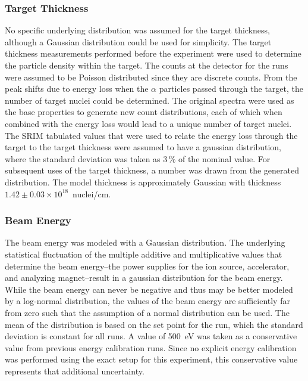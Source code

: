 \subsubsection{Target Thickness}
No specific underlying distribution was assumed for the target
thickness, although a Gaussian distribution could be used for
simplicity. The target thickness measurements performed before the
experiment were used to determine the particle density within the
target. The counts at the detector for the runs were assumed to be
Poisson distributed since they are discrete counts. From the peak shifts
due to energy loss when the $\alpha$ particles passed through the
target, the number of target nuclei could be determined. The original
spectra were used as the base properties to generate new count
distributions, each of which when combined with the energy loss would
lead to a unique number of target nuclei. The SRIM tabulated values that
were used to relate the energy loss through the target to the target
thickness were assumed to have a gaussian distribution, where the
standard deviation was taken as 3\,\% of the nominal value. For
subsequent uses of the target thickness, a number was drawn from the
generated distribution. The model thickness is approximately Gaussian
with thickness $1.42 \pm 0.03 \times 10^{18}$~nuclei/cm\squared{}.

\subsubsection{Beam Energy}
The beam energy was modeled with a Gaussian distribution. The underlying
statistical fluctuation of the multiple additive and multiplicative
values that determine the beam energy\---{}the power supplies for the
ion source, accelerator, and analyzing magnet\---{}result in a gaussian
distribution for the beam energy. While the beam energy can never be
negative and thus may be better modeled by a log-normal distribution,
the values of the beam energy are sufficiently far from zero such that
the assumption of a normal distribution can be used. The mean of the
distribution is based on the set point for the run, which the standard
deviation is constant for all runs. A value of 500~eV was taken as a
conservative value from previous energy calibration runs. Since no
explicit energy calibration was performed using the exact setup for this
experiment, this conservative value represents that additional
uncertainty.

